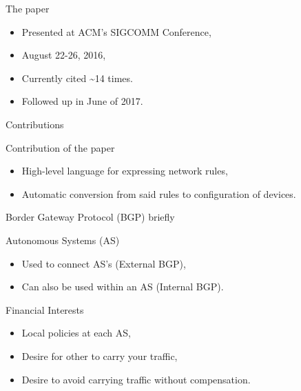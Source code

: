 \begin{frame}{The paper}
    \begin{block}{}
        \begin{itemize}
            \item Presented at ACM's SIGCOMM Conference,
            \item August 22-26, 2016,
            \item Currently cited \~{}14 times.
            \item Followed up in June of 2017.
        \end{itemize}
    \end{block}
\end{frame}

\begin{frame}{Contributions}
    \begin{block}{Contribution of the paper}
        \begin{itemize}
            \item High-level language for expressing \textcolor{ReneOrange}{network rules},
            \item \textcolor{ReneOrange}{Automatic conversion} from said rules to configuration of devices.
        \end{itemize}
    \end{block}
\end{frame}

\begin{frame}{Border Gateway Protocol (BGP) briefly}
    \begin{block}{Autonomous Systems (AS)}
        \begin{itemize}
            \item Used to connect AS's (External BGP),
            \item Can also be used within an AS (Internal BGP).
        \end{itemize}
    \end{block}
    \begin{block}{Financial Interests}
        \begin{itemize}
            \item Local policies at each AS,
            \item Desire for other to carry your traffic,
            \item Desire to avoid carrying traffic without compensation.
        \end{itemize}
    \end{block}
\end{frame}

